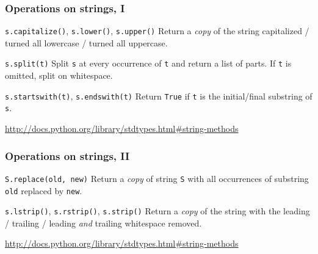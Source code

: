 \documentclass[english,serif,mathserif,xcolor=pdftex,dvipsnames,table]{beamer}
\begin{document}
\begin{frame}[fragile]
  \frametitle{Operations on strings, I}
  \begin{describe}{%
      \lstinline|s.capitalize()|,
      \lstinline|s.lower()|, 
      \lstinline|s.upper()|}
    Return a \emph{copy} of the string capitalized / turned all lowercase /
    turned all uppercase.
  \end{describe}
  
  \begin{describe}{\lstinline|s.split(t)|}
    Split \texttt{s} at every occurrence of \texttt{t} and return a list
    of parts.  If \texttt{t} is omitted, split on whitespace.
  \end{describe}
  
  \begin{describe}{\lstinline|s.startswith(t)|, 
      \lstinline|s.endswith(t)|}
    Return \texttt{True} if \texttt{t} is the initial/final substring
    of \texttt{s}.
  \end{describe}
  
  \begin{references}
    \url{http://docs.python.org/library/stdtypes.html#string-methods}
  \end{references}
\end{frame}


\begin{frame}[fragile]
  \frametitle{Operations on strings, II}
  \begin{describe}{\lstinline|S.replace(old, new)|}
    Return a \emph{copy} of string \texttt{S} with all occurrences of
    substring \texttt{old} replaced by \texttt{new}.
  \end{describe}
  
  \begin{describe}{%
      \lstinline|s.lstrip()|,
      \lstinline|s.rstrip()|, 
      \lstinline|s.strip()|}
    Return a \emph{copy} of the string with the leading / trailing /
    leading \emph{and} trailing whitespace removed.
  \end{describe}
  
  \begin{references}
    \url{http://docs.python.org/library/stdtypes.html#string-methods}
  \end{references}
\end{frame}
\end{document}

